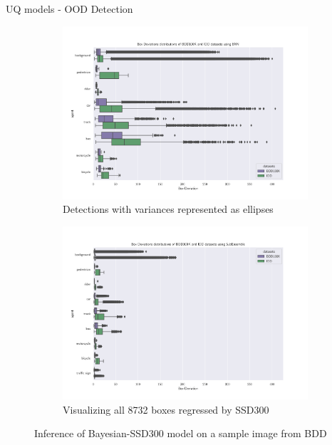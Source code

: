 \documentclass[10pt, aspectratio=169]{beamer}
\begin{document}
\begin{frame}[allowframebreaks]{UQ models - OOD Detection}
    \begin{figure}[H]
        \captionsetup[table]{skip=0pt}
            \centering
            \begin{subfigure}[t]{0.495\textwidth}
                \centering
                \includegraphics[width=\textwidth]{images/distributions/BNN_bdd_vs_iid_deviations.png}
                \caption{Detections with variances represented as ellipses}
            \end{subfigure}
            \begin{subfigure}[t]{0.495\textwidth}
                \centering
                \includegraphics[width=\textwidth]{images/distributions/SubEns_bdd_vs_iid_deviations.png}
                \caption{Visualizing all 8732 boxes regressed by SSD300}
            \end{subfigure}
            \caption{Inference of Bayesian-SSD300 model on a sample image from BDD}
    \end{figure}


\end{frame}
\end{document}
